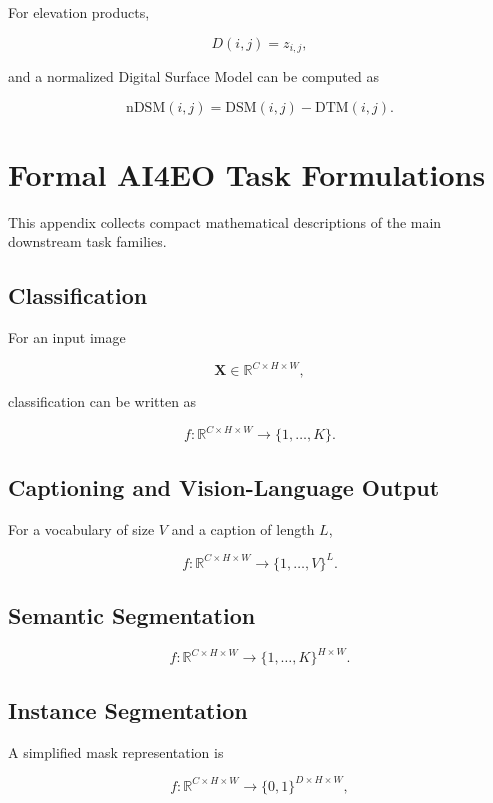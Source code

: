 \documentclass[
    11pt,
    a4paper,
    parskip=half,
    bibliography=totoc,
    numbers=noenddot
]{scrartcl}
\begin{document}
For elevation products,

\[
D(i,j)=z_{i,j},
\]

and a normalized Digital Surface Model can be computed as

\[
\mathrm{nDSM}(i,j)=\mathrm{DSM}(i,j)-\mathrm{DTM}(i,j).
\]

\section{Formal AI4EO Task Formulations}
\label{app:task-formulations}

This appendix collects compact mathematical descriptions of the main
downstream task families.

\subsection{Classification}

For an input image

\[
\mathbf{X}\in\mathbb{R}^{C\times H\times W},
\]

classification can be written as

\[
f:
\mathbb{R}^{C\times H\times W}
\rightarrow
\{1,\ldots,K\}.
\]

\subsection{Captioning and Vision-Language Output}

For a vocabulary of size \(V\) and a caption of length \(L\),

\[
f:
\mathbb{R}^{C\times H\times W}
\rightarrow
\{1,\ldots,V\}^{L}.
\]

\subsection{Semantic Segmentation}

\[
f:
\mathbb{R}^{C\times H\times W}
\rightarrow
\{1,\ldots,K\}^{H\times W}.
\]

\subsection{Instance Segmentation}

A simplified mask representation is

\[
f:
\mathbb{R}^{C\times H\times W}
\rightarrow
\{0,1\}^{D\times H\times W},
\]
\end{document}
